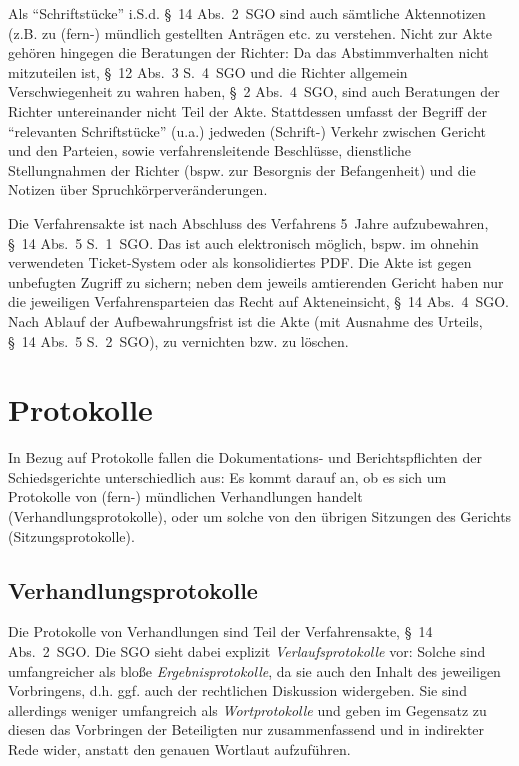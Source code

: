 Als \enquote{Schriftstücke} i.S.d. \S~14 Abs.~2~SGO sind auch sämtliche Aktennotizen (z.B. zu (fern-) mündlich gestellten Anträgen etc. zu verstehen.
Nicht zur Akte gehören hingegen die Beratungen der Richter:
Da das Abstimmverhalten nicht mitzuteilen ist, \S~12 Abs.~3 S.~4~SGO und die Richter allgemein Verschwiegenheit zu wahren haben, \S~2 Abs.~4~SGO, sind auch Beratungen der Richter untereinander nicht Teil der Akte.
Stattdessen umfasst der Begriff der \enquote{relevanten Schriftstücke} (u.a.) jedweden (Schrift-) Verkehr zwischen Gericht und den Parteien, sowie verfahrensleitende Beschlüsse, dienstliche Stellungnahmen der Richter (bspw. zur Besorgnis der Befangenheit) und die Notizen über Spruchkörperveränderungen.

Die Verfahrensakte ist nach Abschluss des Verfahrens 5~Jahre aufzubewahren, \S~14 Abs.~5 S.~1~SGO.
Das ist auch elektronisch möglich, bspw. im ohnehin verwendeten Ticket-System oder als konsolidiertes PDF.
Die Akte ist gegen unbefugten Zugriff zu sichern; neben dem jeweils amtierenden Gericht haben nur die jeweiligen Verfahrensparteien das Recht auf Akteneinsicht, \S~14 Abs.~4~SGO.
Nach Ablauf der Aufbewahrungsfrist ist die Akte (mit Ausnahme des Urteils, \S~14 Abs.~5 S.~2~SGO), zu vernichten bzw. zu löschen.

\section{Protokolle}
\label{Dokumentation:Protokolle}
In Bezug auf Protokolle fallen die Dokumentations- und Berichtspflichten der Schiedsgerichte unterschiedlich aus:
Es kommt darauf an, ob es sich um Protokolle von (fern-) mündlichen Verhandlungen handelt (Verhandlungsprotokolle), oder um solche von den übrigen Sitzungen des Gerichts (Sitzungsprotokolle).

\subsection{Verhandlungsprotokolle}
\label{Dokumentation:Protokolle:Verhandlungsprotokolle}
Die Protokolle von Verhandlungen sind Teil der Verfahrensakte, \S~14 Abs.~2~SGO.
Die SGO sieht dabei explizit \emph{Verlaufsprotokolle} vor:
Solche sind umfangreicher als bloße \emph{Ergebnisprotokolle}, da sie auch den Inhalt des jeweiligen Vorbringens, d.h. ggf. auch der rechtlichen Diskussion widergeben.
Sie sind allerdings weniger umfangreich als \emph{Wortprotokolle} und geben im Gegensatz zu diesen das Vorbringen der Beteiligten nur zusammenfassend und in indirekter Rede wider, anstatt den genauen Wortlaut aufzuführen.

